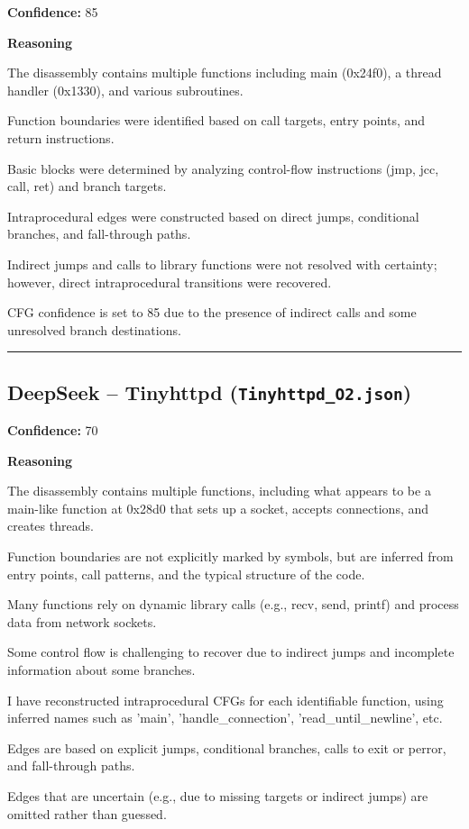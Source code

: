 \textbf{Confidence:} 85

\textbf{Reasoning}

The disassembly contains multiple functions including main (0x24f0), a thread handler (0x1330), and various subroutines.

Function boundaries were identified based on call targets, entry points, and return instructions.

Basic blocks were determined by analyzing control-flow instructions (jmp, jcc, call, ret) and branch targets.

Intraprocedural edges were constructed based on direct jumps, conditional branches, and fall-through paths.

Indirect jumps and calls to library functions were not resolved with certainty; however, direct intraprocedural transitions were recovered.

CFG confidence is set to 85 due to the presence of indirect calls and some unresolved branch destinations.

\bigskip
\hrule
\bigskip

\subsection{DeepSeek -- Tinyhttpd (\texttt{Tinyhttpd\_O2.json})}

\textbf{Confidence:} 70

\textbf{Reasoning}

The disassembly contains multiple functions, including what appears to be a main-like function at 0x28d0 that sets up a socket, accepts connections, and creates threads.

Function boundaries are not explicitly marked by symbols, but are inferred from entry points, call patterns, and the typical structure of the code.

Many functions rely on dynamic library calls (e.g., recv, send, printf) and process data from network sockets.

Some control flow is challenging to recover due to indirect jumps and incomplete information about some branches.

I have reconstructed intraprocedural CFGs for each identifiable function, using inferred names such as 'main', 'handle\_connection', 'read\_until\_newline', etc.

Edges are based on explicit jumps, conditional branches, calls to exit or perror, and fall-through paths.

Edges that are uncertain (e.g., due to missing targets or indirect jumps) are omitted rather than guessed.


